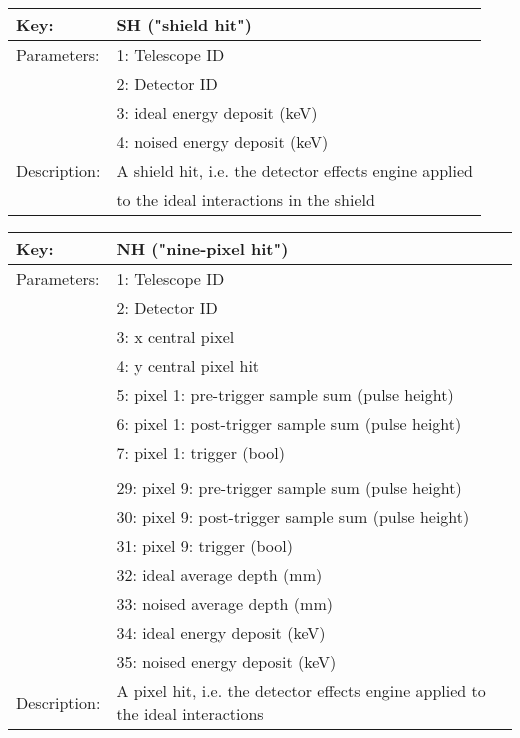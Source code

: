 \begin{table}[htdp]
\begin{center}
\begin{tabular}{|p{2cm}|p{12cm}|}
\hline
Key:&	SH ("shield hit")\\
\hline
Parameters:&	1: Telescope ID\\
&2: Detector ID\\
&3: ideal energy deposit (keV)\\
&4: noised energy deposit (keV)\\
\hline
Description:&	A shield hit, i.e. the detector effects engine applied \\
& to the ideal interactions in the shield\\
\hline
\end{tabular}
\end{center}
\end{table}

\begin{table}[htdp]
\begin{center}
\begin{tabular}{|p{2cm}|p{12cm}|}
\hline
Key:&	NH ("nine-pixel hit")\\
\hline
Parameters:&	1: Telescope ID\\
&2: Detector ID\\
&3: x central pixel\\
&4: y central pixel hit\\
&5: pixel 1: pre-trigger sample sum (pulse height)\\
&6: pixel 1: post-trigger sample sum (pulse height)\\
&7: pixel 1: trigger (bool)\\
&\\
&29: pixel 9: pre-trigger sample sum (pulse height)\\
&30: pixel 9: post-trigger sample sum (pulse height)\\
&31: pixel 9: trigger (bool)\\
&32: ideal average depth (mm)\\
&33: noised average depth (mm)\\
&34: ideal energy deposit (keV)\\
&35: noised energy deposit (keV)\\
\hline
Description:&	A pixel hit, i.e. the detector effects engine applied to the ideal interactions\\
\hline
\end{tabular}
\end{center}
\end{table}

